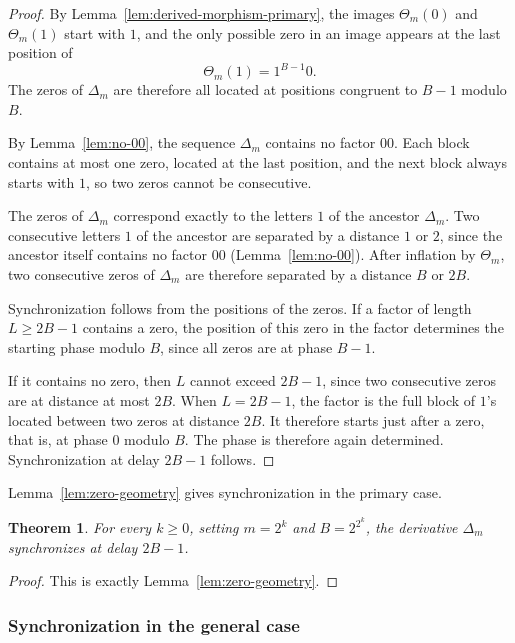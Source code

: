 \documentclass[12pt,reqno]{article}
\theoremstyle{plain}
\newtheorem{theorem}{Theorem}[section]
\theoremstyle{definition}
\begin{document}
\begin{proof}
By Lemma~\ref{lem:derived-morphism-primary}, the images $\Theta_m(0)$ and $\Theta_m(1)$ start with $1$, and the only possible zero in an image appears at the last position of
\[
  \Theta_m(1) = 1^{B-1} 0.
\]
The zeros of $\Delta_m$ are therefore all located at positions congruent to $B - 1$ modulo $B$.

By Lemma~\ref{lem:no-00}, the sequence $\Delta_m$ contains no factor $00$. Each block contains at most one zero, located at the last position, and the next block always starts with $1$, so two zeros cannot be consecutive.

The zeros of $\Delta_m$ correspond exactly to the letters $1$ of the ancestor $\Delta_m$. Two consecutive letters $1$ of the ancestor are separated by a distance $1$ or $2$, since the ancestor itself contains no factor $00$ (Lemma~\ref{lem:no-00}). After inflation by $\Theta_m$, two consecutive zeros of $\Delta_m$ are therefore separated by a distance $B$ or $2B$.

Synchronization follows from the positions of the zeros. If a factor of length $L \ge 2B - 1$ contains a zero, the position of this zero in the factor determines the starting phase modulo $B$, since all zeros are at phase $B - 1$.

If it contains no zero, then $L$ cannot exceed $2B - 1$, since two consecutive zeros are at distance at most $2B$. When $L = 2B - 1$, the factor is the full block of $1$'s located between two zeros at distance $2B$. It therefore starts just after a zero, that is, at phase $0$ modulo $B$. The phase is therefore again determined. Synchronization at delay $2B - 1$ follows.
\end{proof}

Lemma~\ref{lem:zero-geometry} gives synchronization in the primary case.

\begin{theorem}
\label{thm:dnc-primary}
For every $k \ge 0$, setting $m = 2^k$ and $B = 2^{2^k}$, the derivative
$\Delta_m$ synchronizes at delay $2B-1$.
\end{theorem}

\begin{proof}
This is exactly Lemma~\ref{lem:zero-geometry}.
\end{proof}

\subsubsection{Synchronization in the general case}
\end{document}
